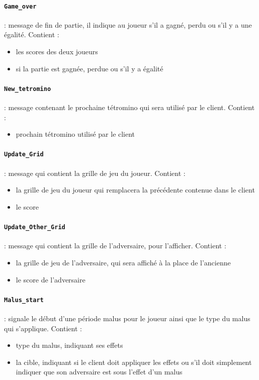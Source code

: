 \documentclass[a4paper, 12pt]{article}
\begin{document}
				\paragraph{\texttt{Game\_over}} : message de fin de partie, il indique au joueur s'il a gagné, perdu ou s'il y a une égalité. Contient :
					\begin{itemize}
						\item les scores des deux joueurs
						\item si la partie est gagnée, perdue ou s'il y a égalité
					\end{itemize}

				\paragraph{\texttt{New\_tetromino}} : message contenant le prochaine tétromino qui sera utilisé par le client. Contient :
					\begin{itemize}
						\item prochain tétromino utilisé par le client
					\end{itemize}

				\paragraph{\texttt{Update\_Grid}} : message qui contient la grille de jeu du joueur. Contient :
					\begin{itemize}
						\item la grille de jeu du joueur qui remplacera la précédente contenue dans le client
						\item le score
					\end{itemize}

				\paragraph{\texttt{Update\_Other\_Grid}} : message qui contient la grille de l'adversaire, pour l'afficher. Contient :
					\begin{itemize}
						\item la grille de jeu de l'adversaire, qui sera affiché à la place de l'ancienne
						\item le score de l'adversaire
					\end{itemize}

				\paragraph{\texttt{Malus\_start}} : signale le début d'une période malus pour le joueur ainsi que le type du malus qui s'applique. Contient :
					\begin{itemize}
						\item type du malus, indiquant ses effets
						\item la cible, indiquant si le client doit appliquer les effets ou s'il doit simplement indiquer que son adversaire est sous l'effet d'un malus
					\end{itemize}
\end{document}

